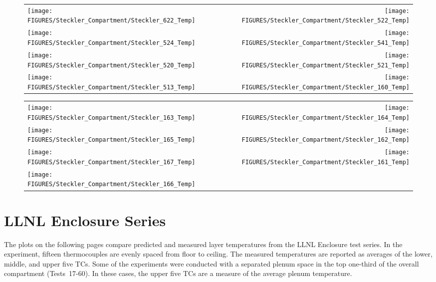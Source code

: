 \begin{figure}[p]
\begin{tabular*}{\textwidth}{l@{\extracolsep{\fill}}r}
\texttt{[image: FIGURES/Steckler\_Compartment/Steckler\_622\_Temp]} &
\texttt{[image: FIGURES/Steckler\_Compartment/Steckler\_522\_Temp]} \\
\texttt{[image: FIGURES/Steckler\_Compartment/Steckler\_524\_Temp]} &
\texttt{[image: FIGURES/Steckler\_Compartment/Steckler\_541\_Temp]} \\
\texttt{[image: FIGURES/Steckler\_Compartment/Steckler\_520\_Temp]} &
\texttt{[image: FIGURES/Steckler\_Compartment/Steckler\_521\_Temp]} \\
\texttt{[image: FIGURES/Steckler\_Compartment/Steckler\_513\_Temp]} &
\texttt{[image: FIGURES/Steckler\_Compartment/Steckler\_160\_Temp]}
\end{tabular*}
\label{Steckler_Temp_6}
\end{figure}

\begin{figure}[p]
\begin{tabular*}{\textwidth}{l@{\extracolsep{\fill}}r}
\texttt{[image: FIGURES/Steckler\_Compartment/Steckler\_163\_Temp]} &
\texttt{[image: FIGURES/Steckler\_Compartment/Steckler\_164\_Temp]} \\
\texttt{[image: FIGURES/Steckler\_Compartment/Steckler\_165\_Temp]} &
\texttt{[image: FIGURES/Steckler\_Compartment/Steckler\_162\_Temp]} \\
\texttt{[image: FIGURES/Steckler\_Compartment/Steckler\_167\_Temp]} &
\texttt{[image: FIGURES/Steckler\_Compartment/Steckler\_161\_Temp]} \\
\texttt{[image: FIGURES/Steckler\_Compartment/Steckler\_166\_Temp]} &
\end{tabular*}
\label{Steckler_Temp_7}
\end{figure}

\clearpage


\section{LLNL Enclosure Series}

The plots on the following pages compare predicted and measured layer temperatures from the LLNL Enclosure test series.
In the experiment, fifteen thermocouples are evenly spaced from floor to ceiling.
The measured temperatures are reported as averages of the lower, middle, and upper five TCs.
Some of the experiments were conducted with a separated plenum space in the top one-third of the overall compartment (Tests~17-60). In these cases, the
upper five TCs are a measure of the average plenum temperature.

